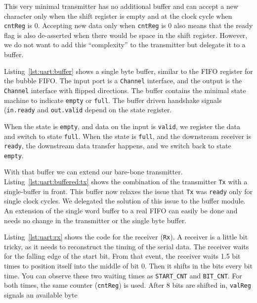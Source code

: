 \documentclass[%
    10pt,
    headinclude, footexclude,
    openright, %
    notitlepage,
    cleardoubleempty,
    headsepline,
    pointlessnumbers,
    bibtotoc, idxtotoc,
    ]{scrbook}
\newcommand{\code}[1]{{\small{\texttt{#1}}}}
\begin{document}
This very minimal transmitter has no additional buffer and can
accept a new character only when the shift register is empty
and at the clock cycle when \code{cntReg} is 0.
Accepting new data only when \code{cntReg} is 0 also means
that the ready flag is also de-asserted when there would be
space in the shift register. However, we do not want to add this
``complexity'' to the transmitter but delegate it to a buffer.

Listing~\ref{lst:uart:buffer} shows a single byte buffer, similar to
the FIFO register for the bubble FIFO. The input port is a \code{Channel}
interface, and the output is the \code{Channel} interface with
flipped directions. The buffer contains the minimal state machine
to indicate \code{empty} or \code{full}. The buffer driven handshake
signals (\code{in.ready} and \code{out.valid} depend on the state
register.

When the state is \code{empty}, and data on the input is \code{valid},
we register the data and switch to state \code{full}.
When the state is \code{full}, and the downstream receiver is
\code{ready}, the downstream data transfer happens, and we switch
back to state \code{empty}.

With that buffer we can extend our bare-bone transmitter.
Listing~\ref{lst:uart:buffered:tx} shows the combination of the transmitter \code{Tx}
with a single-buffer in front. This buffer now relaxes the issue that \code{Tx}
was \code{ready} only for single clock cycles. We delegated the solution of
this issue to the buffer module.
An extension of the single word buffer to a real FIFO can easily be done
and needs no change in the transmitter or the single byte buffer.

Listing~\ref{lst:uart:rx} shows the code for the receiver (\code{Rx}).
A receiver is a little bit tricky, as it needs to reconstruct the timing of
the serial data. The receiver waits for the falling edge of the start bit.
From that event, the receiver waits 1.5 bit times to position itself into the middle
of bit 0. Then it shifts in the bits every bit time. You can observe these
two waiting times as \code{START\_CNT} and \code{BIT\_CNT}.
For both times, the same counter (\code{cntReg}) is used.
After 8 bits are shifted in, \code{valReg} signals an available byte
\end{document}
